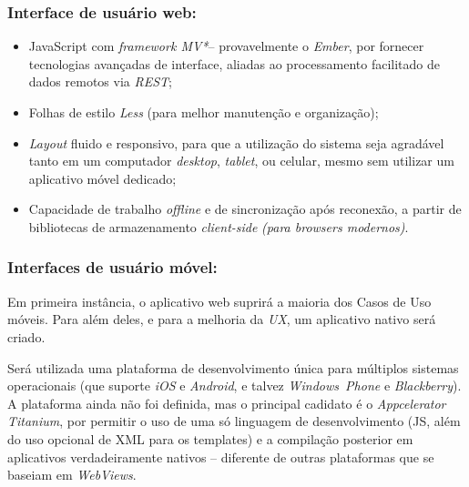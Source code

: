 \documentclass[a4paper]{abnt}
\begin{document}
\subsubsection{Interface de usuário web:}
\begin{itemize}
	\item JavaScript com \emph{framework MV*}\footnotemark -- provavelmente o \emph{Ember}, por fornecer tecnologias avançadas de interface, aliadas ao processamento facilitado de dados remotos via \emph{REST};
			
	\item Folhas de estilo \emph{Less}\footnotemark{} (para melhor manutenção e organização);
			
	\item \emph{Layout} fluido e responsivo, para que a utilização do sistema seja agradável tanto em um computador \emph{desktop}, \emph{tablet}, ou celular, mesmo sem utilizar um aplicativo móvel \mbox{dedicado};
		
	\item Capacidade de trabalho \emph{offline} e de sincronização após reconexão, a partir de bibliotecas de armazenamento \emph{client-side} \emph{(para browsers modernos)}.
\end{itemize}

\subsubsection{Interfaces de usuário móvel:}
Em primeira instância, o aplicativo web suprirá a maioria dos Casos de Uso móveis. Para além deles, e para a melhoria da \emph{UX}\footnotemark, um aplicativo nativo será criado.
	
Será utilizada uma plataforma de desenvolvimento única para múltiplos sistemas operacionais (que suporte \emph{iOS} e \emph{Android}, e talvez \emph{Windows~Phone} e \emph{Blackberry}). A plataforma ainda não foi definida, mas o principal cadidato é o \emph{Appcelerator Titanium}, por permitir o uso de uma só linguagem de desenvolvimento (JS, além do uso opcional de XML para os templates) e a compilação posterior em aplicativos verdadeiramente nativos -- diferente de outras plataformas que se baseiam em \emph{WebViews}.	
\end{document}
